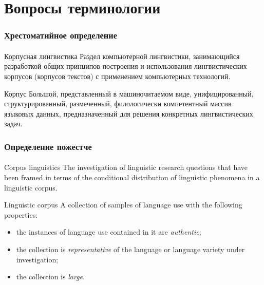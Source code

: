 % 

\frame{\titlepage}

\section{Вопросы терминологии}

\frame{\tableofcontents[currentsection]}

\begin{frame}
    \frametitle{Хрестоматийное определение}
    \framesubtitle{\autocite[7]{zakharov_bogdanova:2011}}

    \begin{block}{Корпусная лингвистика}
        Раздел компьютерной лингвистики, занимающийся разработкой общих принципов построения и использования лингвистических корпусов (корпусов текстов) с применением компьютерных технологий.
    \end{block}

    \vfill

    \begin{block}{Корпус}
        Большой, представленный в машиночитаемом виде, унифицированный, структурированный, размеченный, филологически компетентный массив языковых данных, предназначенный для решения конкретных лингвистических задач.
    \end{block}
\end{frame}

\begin{frame}
    \frametitle{Определение пожестче}
    \framesubtitle{\autocite[22--23, 56]{stefanowitsch:2020}}

    \begin{block}{Corpus linguistics}
        The investigation of linguistic research questions that have been framed in terms of the conditional distribution of linguistic phenomena in a linguistic corpus.
    \end{block}

    \vfill

    \begin{block}{Linguistic corpus}
        A collection of samples of language use with the following properties: \begin{itemize}
            \item the instances of language use contained in it are \textit{authentic};
            \item the collection is \textit{representative} of the language or language variety under investigation;
            \item the collection is \textit{large}.
        \end{itemize}
    \end{block}
\end{frame}

